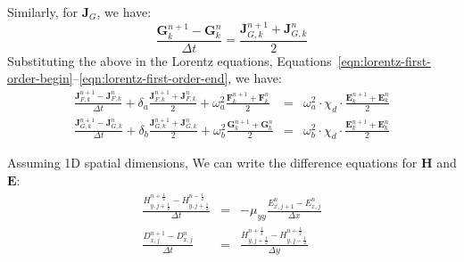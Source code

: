 \documentclass{article}[12pt]
\theoremstyle{plain}
\begin{document}
Similarly, for $\mathbf{J}_G$, we have:
\begin{equation}
\frac{ \mathbf{G}^{n+1}_k - \mathbf{G}^n_k}{\Delta t} = \frac{\mathbf{J}_{G,k}^{n+1}+\mathbf{J}_{G,k}^n}{2}
\end{equation}
Substituting the above in the Lorentz equations, Equations~\ref{eqn:lorentz-first-order-begin}--\ref{eqn:lorentz-first-order-end}, we have:
\begin{eqnarray}
\frac{ \mathbf{J}^{n+1}_{F,k} - \mathbf{J}^n_{F,k}}{\Delta t} + \delta_a \frac{\mathbf{J}_{F,k}^{n+1}+\mathbf{J}_{F,k}^n}{2}
+ \omega^2_a \frac{\mathbf{F}_{k}^{n+1}+\mathbf{F}_{k}^n}{2} & = & \omega^2_a \cdot \chi_d \cdot 
\frac{\mathbf{E}^{n+1}_k+\mathbf{E}^n_k}{2} \\
\frac{ \mathbf{J}^{n+1}_{G,k} - \mathbf{J}^n_{G,k}}{\Delta t} + \delta_b \frac{\mathbf{J}_{G,k}^{n+1}+\mathbf{J}_{G,k}^n}{2}
+ \omega^2_b \frac{\mathbf{G}_{k}^{n+1}+\mathbf{G}_{k}^n}{2} & = & \omega^2_b \cdot \chi_d \cdot 
\frac{\mathbf{E}^{n+1}_k+\mathbf{E}^n_k}{2} 
\end{eqnarray}

Assuming 1D spatial dimensions, We can write the difference equations for $\mathbf{H}$ and $\mathbf{E}$:
\begin{eqnarray}
\frac{H_{y,j+\frac{1}{2}}^{n+\frac{1}{2}} - H_{y,j+\frac{1}{2}}^{n-\frac{1}{2}}}{\Delta t} & = & -\mu_{yy}
\frac{E_{x,j+1}^{n} - E_{x,j}^{n}}{\Delta x} \\
\frac{D_{x,j}^{n+1} - D_{x,j}^{n}}{\Delta t} & = & \frac{H_{y,j+\frac{1}{2}}^{n+\frac{1}{2}} - H_{y,j-\frac{1}{2}}^{n+\frac{1}{2}}}{\Delta y}
\end{eqnarray}
\end{document}
